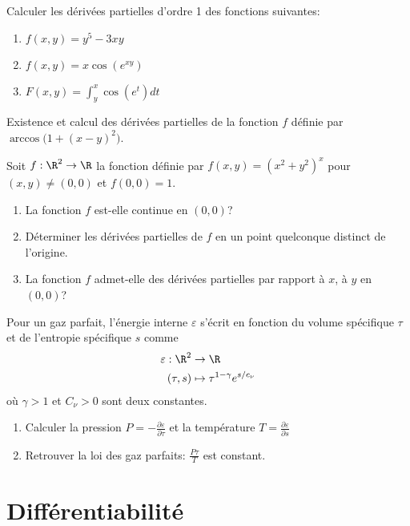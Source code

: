 \documentclass{tp_um}
\begin{document}
\exo{} Calculer les dérivées partielles d'ordre 1 des fonctions suivantes:
\begin{enumerate}
	\item $f (x, y) = y^5-3xy $ 
\item $f(x, y) = x \cos(e^{xy} )$
\item $F(x,y) = \int_y^x \cos(e^t) dt$
\end{enumerate}

\newpage
\exo[*]{} Existence et calcul des dérivées partielles de la fonction $f$ définie par $\arccos \big( 1+( x-y )^2 \big)$.

\newpage
\exo{} Soit $f:\R^2\rightarrow \R$ la fonction
d\'efinie par $f(x,y)=(x^2+y^2)^x$ pour $(x,y)\not=(0,0)$ et
$f(0,0)= 1$.
\begin{enumerate}
 \item La fonction $f$ est-elle continue en $(0,0)$?
 \item D\'eterminer les d\'eriv\'ees partielles de $f$ en un point
quelconque distinct de l'origine.
 \item  La fonction $f$ admet-elle des d\'eriv\'ees partielles par
rapport \`a $x$, \`a $y$ en $(0,0)$?
\end{enumerate}

\newpage

Pour un gaz parfait, l'énergie interne $\varepsilon$ s'écrit en fonction du volume spécifique $\tau$ et de l'entropie spécifique $s$ comme
\begin{align*}
	\varepsilon: \R^2 & \to \R \\
	(\tau,s) & \mapsto \tau^{1-\gamma} e^{s/c_\nu}
\end{align*}
où $\gamma>1$ et $C_\nu>0$ sont deux constantes. 
\begin{enumerate}
	\item	Calculer la pression $P = -\frac{\partial \varepsilon}{\partial \tau} $ et la température $T = \frac{\partial\varepsilon}{\partial s}$
	\item  Retrouver la loi des gaz parfaits: $\frac{P\tau}{T}$ est constant.
\end{enumerate}

\newpage
\section{Différentiabilité}
\end{document}
